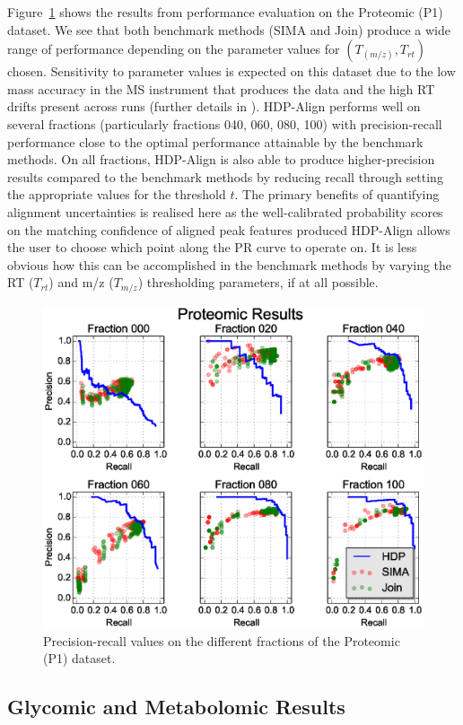 Figure~\ref{fig:proteomic_results} shows the results from performance evaluation on the Proteomic (P1) dataset. We see that both benchmark methods (SIMA and Join) produce a wide range of performance depending on the parameter values for $(T_{(m/z)}, T_{rt})$ chosen. Sensitivity to parameter values is expected on this dataset due to the low mass accuracy in the MS instrument that produces the data and the high \ac{RT} drifts present across runs (further details in \cite{Lange2008}). HDP-Align performs well on several fractions (particularly fractions 040, 060, 080, 100) with precision-recall performance close to the optimal performance attainable by the benchmark methods. On all fractions, HDP-Align is also able to produce higher-precision results compared to the benchmark methods by reducing recall through setting the appropriate values for the threshold $t$. The primary benefits of quantifying alignment uncertainties is realised here as the well-calibrated probability scores on the matching confidence of aligned peak features produced HDP-Align allows the user to choose which point along the PR curve to operate on. It is less obvious how this can be accomplished in the benchmark methods by varying the \ac{RT} ($T_{rt}$) and m/z ($T_{m/z}$) thresholding parameters, if at all possible.

\begin{figure}[!htbp]
\centering\includegraphics[width=0.7\linewidth]{05-hdp/figures/figure_4.eps}
\centering\caption{\label{fig:proteomic_results}Precision-recall values on the different fractions of the Proteomic (P1) dataset.}
\end{figure}

\subsection{Glycomic and Metabolomic Results}
\label{sub:glycomic-metabolomic-results}

